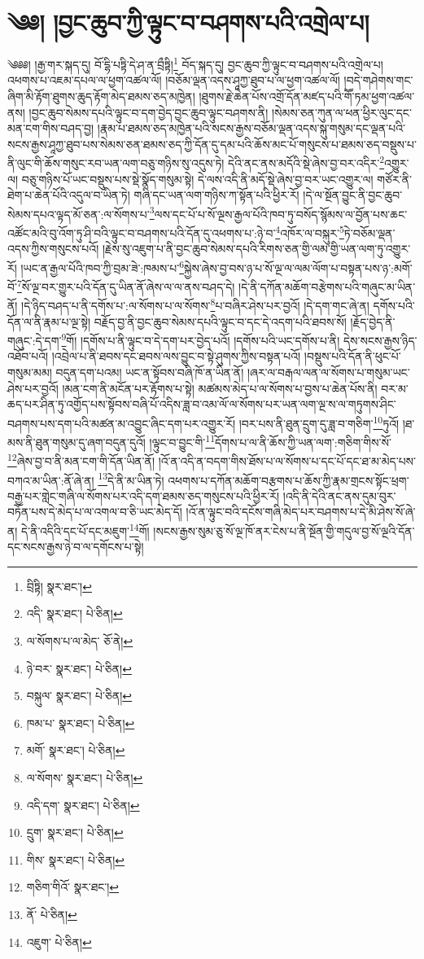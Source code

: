 \setcounter{footnote}{0} 
\chapter{༄༅། །བྱང་ཆུབ་ཀྱི་ལྟུང་བ་བཤགས་པའི་འགྲེལ་པ།}༄༅༅། །རྒྱ་གར་སྐད་དུ། བོ་དྷི་པཏྟི་དེ་ཤ་ན་བྲྀཏྟི།\footnote{བྲིཏྟི།  སྣར་ཐང་། } བོད་སྐད་དུ། བྱང་ཆུབ་ཀྱི་ལྟུང་བ་བཤགས་པའི་འགྲེལ་པ། འཕགས་པ་འཇམ་དཔལ་ལ་ཕྱག་འཚལ་ལོ། །བཅོམ་ལྡན་འདས་ཤཱཀྱ་ཐུབ་པ་ལ་ཕྱག་འཚལ་ལོ། །བདེ་གཤེགས་གང་ཞིག་མི་རྟོག་ཐུགས་ཆུད་རྟོག་མེད་ཐམས་ཅད་མཁྱེན། །ཐུགས་རྗེ་ཆེན་པོས་འགྲོ་དོན་མཛད་པའི་གཽ་ཏམ་ཕྱག་འཚལ་ནས། །བྱང་ཆུབ་སེམས་དཔའི་ལྟུང་བ་དག་བྱེད་བྱང་ཆུབ་ལྟུང་བཤགས་ནི། །སེམས་ཅན་ཀུན་ལ་ཕན་ཕྱིར་ལུང་དང་མན་ངག་གིས་བཤད་བྱ། །རྣམ་པ་ཐམས་ཅད་མཁྱེན་པའི་སངས་རྒྱས་བཅོམ་ལྡན་འདས་སྐུ་གསུམ་དང་ལྡན་པའི་སངས་རྒྱས་ཤཱཀྱ་ཐུབ་པས་སེམས་ཅན་ཐམས་ཅད་ཀྱི་དོན་དུ་དམ་པའི་ཆོས་མང་པོ་གསུངས་པ་ཐམས་ཅད་བསྡུས་པ་ནི་ལུང་གི་ཆོས་གསུང་རབ་ཡན་ལག་བཅུ་གཉིས་སུ་འདུས་ཏེ། དེའི་ནང་ནས་མདོའི་སྡེ་ཞེས་བྱ་བར་འདིར་\footnote{འདི་  སྣར་ཐང་།  པེ་ཅིན། }འགྱུར་ལ། བཅུ་གཉིས་པོ་ཡང་བསྡུས་པས་སྡེ་སྣོད་གསུམ་སྟེ། དེ་ལས་འདི་ནི་མདོ་སྡེ་ཞེས་བྱ་བར་ཡང་འགྱུར་ལ། གཙོར་ནི་ཐེག་པ་ཆེན་པོའི་འདུལ་བ་ཡིན་ཏེ། གཞི་དང་ཡན་ལག་གཉིས་ཀ་སྟོན་པའི་ཕྱིར་རོ། །དེ་ལ་སྔོན་བྱུང་ནི་བྱང་ཆུབ་སེམས་དཔའ་ལྟད་མོ་ཅན་:ལ་སོགས་པ་\footnote{ལ་སོགས་པ་ལ་མེད་  ཅོ་ནེ། }ལས་དང་པོ་པ་སོ་ལྔས་རྒྱལ་པོའི་ཁབ་ཏུ་བསོད་སྙོམས་ལ་བྱོན་པས་ཆང་འཚོང་མའི་བུ་འོག་ཏུ་ཤི་བའི་ལྟུང་བ་བཤགས་པའི་དོན་དུ་འཕགས་པ་:ཉེ་བ་\footnote{ཉེ་བར་  སྣར་ཐང་།  པེ་ཅིན། }འཁོར་ལ་བསྐུར་\footnote{བསྐུལ་  སྣར་ཐང་།  པེ་ཅིན། }ཏེ་བཅོམ་ལྡན་འདས་ཀྱིས་གསུངས་པའོ། །རྗེས་སུ་འཇུག་པ་ནི་བྱང་ཆུབ་སེམས་དཔའི་རིགས་ཅན་གྱི་ལམ་གྱི་ཡན་ལག་ཏུ་འགྱུར་རོ། །ཡང་ན་རྒྱལ་པོའི་ཁབ་ཀྱི་བྲམ་ཟེ་:ཁམས་པ་\footnote{ཁམ་པ་  སྣར་ཐང་།  པེ་ཅིན། }སྐྱེས་ཞེས་བྱ་བས་ཉ་པ་སོ་ལྔ་ལ་ལམ་ལོག་པ་བསྟན་པས་ཉ་:མགོ་བོ་\footnote{མགོ་  སྣར་ཐང་།  པེ་ཅིན། }སོ་ལྔ་བར་གྱུར་པའི་དོན་དུ་ཡིན་ནོ་ཞེས་ལ་ལ་ནས་བཤད་དེ། །དེ་ནི་དཀོན་མཆོག་བརྩེགས་པའི་གཞུང་མ་ཡིན་ནོ། །དེ་ཉིད་བཤད་པ་ནི་དགོས་པ་:ལ་སོགས་པ་ལ་སོགས་\footnote{ལ་སོགས་  སྣར་ཐང་།  པེ་ཅིན། }པ་བཞིར་ཤེས་པར་བྱའོ། །དེ་དག་གང་ཞེ་ན། དགོས་པའི་དོན་ལ་ནི་རྣམ་པ་ལྔ་སྟེ། བརྗོད་བྱ་ནི་བྱང་ཆུབ་སེམས་དཔའི་ལྟུང་བ་དང་དེ་འདག་པའི་ཐབས་སོ། །རྗོད་བྱེད་ནི་གཞུང་:དེ་དག་\footnote{འདི་དག་  སྣར་ཐང་།  པེ་ཅིན། }གོ། །དགོས་པ་ནི་ལྟུང་བ་དེ་དག་པར་བྱེད་པའོ། །དགོས་པའི་ཡང་དགོས་པ་ནི། དེས་སངས་རྒྱས་ཉིད་འཐོབ་པའོ། །འབྲེལ་པ་ནི་ཐབས་དང་ཐབས་ལས་བྱུང་བ་སྟེ་ཤུགས་ཀྱིས་བསྟན་པའོ། །བསྡུས་པའི་དོན་ནི་ཕུང་པོ་གསུམ་མམ། བདུན་དག་པའམ། ཡང་ན་སྟོབས་བཞི་ཁོ་ན་ཡིན་ནོ། །ཞར་ལ་བརྒལ་ལན་ལ་སོགས་པ་གསུམ་ཡང་ཤེས་པར་བྱའོ། །མན་ངག་ནི་མངོན་པར་རྟོགས་པ་སྟེ། མཚམས་མེད་པ་ལ་སོགས་པ་བྱས་པ་ཆེན་པོས་ནི། བར་མ་ཆད་པར་ཤིན་ཏུ་འགྱོད་པས་སྟོབས་བཞི་པོ་འདིས་ཟླ་བ་འམ་ལོ་ལ་སོགས་པར་ཡན་ལག་ལྔ་ས་ལ་གཏུགས་ཤིང་བཤགས་པས་དག་པའི་མཚན་མ་འབྱུང་ཞིང་དག་པར་འགྱུར་རོ། །བར་པས་ནི་ཐུན་དྲུག་དུ་ཟླ་བ་གཅིག་\footnote{དྲུག་  སྣར་ཐང་།  པེ་ཅིན། }ཏུའོ། །ཐ་མས་ནི་ཐུན་གསུམ་དུ་ཞག་བདུན་དུའོ། །ལྟུང་བ་བྱུང་གི་\footnote{གིས་  སྣར་ཐང་།  པེ་ཅིན། }དོགས་པ་ལ་ནི་ཆོས་ཀྱི་ཡན་ལག་:གཅིག་གིས་སོ་\footnote{གཅིག་གིའོ་  སྣར་ཐང་། }ཞེས་བྱ་བ་ནི་མན་ངག་གི་དོན་ཡིན་ནོ། །འོ་ན་འདི་ན་བདག་གིས་ཐོས་པ་ལ་སོགས་པ་དང་པོ་དང་ཐ་མ་མེད་པས་བཀའ་མ་ཡིན་:ནོ་ཞེ་ན། \footnote{ནོ་  པེ་ཅིན། }དེ་ནི་མ་ཡིན་ཏེ། འཕགས་པ་དཀོན་མཆོག་བརྩགས་པ་ཆོས་ཀྱི་རྣམ་གྲངས་སྟོང་ཕྲག་བརྒྱ་པར་གླེང་གཞི་ལ་སོགས་པར་འདི་དག་ཐམས་ཅད་གསུངས་པའི་ཕྱིར་རོ། །འདི་ནི་དེའི་ནང་ནས་དུམ་བུར་བཏོན་པས་དེ་མེད་པ་ལ་འགལ་བ་ཅི་ཡང་མེད་དོ། །འོ་ན་ལྟུང་བའི་དངོས་གཞི་མེད་པར་བཤགས་པ་དེ་མི་ཤེས་སོ་ཞེ་ན། དེ་ནི་འདིའི་དང་པོ་དང་མཇུག་\footnote{འཇུག་  པེ་ཅིན། }གོ། །སངས་རྒྱས་སུམ་ཅུ་སོ་ལྔ་ཁོ་ནར་ངེས་པ་ནི་སྔོན་གྱི་གདུལ་བྱ་སོ་ལྔའི་དོན་དང་སངས་རྒྱས་ཉེ་བ་ལ་དགོངས་པ་སྟེ། 
